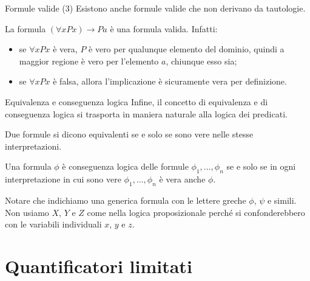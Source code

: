 \documentclass[aspectratio=169,10pt,dvipsnames,xcolor=table]{beamer}
\begin{document}
\begin{frame}{Formule valide (3)}
    Esistono anche formule valide che non derivano da tautologie.
    \begin{example}
        La formula $(\forall x Px) \to Pa$ è una formula valida. Infatti:
        \begin{itemize}
            \item se $\forall x Px$ è vera, $P$ è vero per qualunque elemento del dominio, quindi a maggior regione è vero per l'elemento $a$, chiunque esso sia;
            \item se $\forall x Px$ è falsa, allora l'implicazione è sicuramente vera per definizione.
        \end{itemize}
    \end{example}
\end{frame}

\begin{frame}{Equivalenza e conseguenza logica}
    Infine, il concetto di equivalenza e di conseguenza logica si trasporta in maniera naturale alla logica dei predicati.
    \begin{definition}
        Due formule si dicono \alert{equivalenti} se e solo se sono vere nelle stesse interpretazioni.
    \end{definition}

    \begin{definition}
        Una formula $\phi$ è \alert{conseguenza logica} delle formule $\phi_1, \ldots, \phi_n$ se e solo se in ogni interpretazione in cui sono vere $\phi_1, \ldots, \phi_n$ è vera anche $\phi$.
    \end{definition}

    \medskip
    Notare che indichiamo una generica formula con le lettere greche $\phi$, $\psi$ e simili. Non usiamo $X$, $Y$ e $Z$ come nella logica proposizionale perché si confonderebbero con le variabili individuali $x$, $y$ e $z$.
\end{frame}

\section{Quantificatori limitati}
\end{document}

